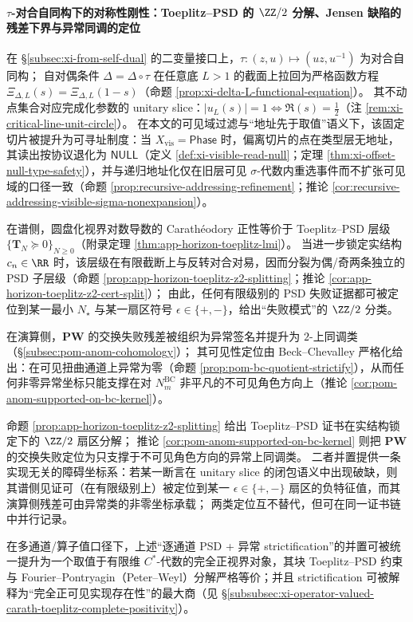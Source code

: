 \paragraph{\texorpdfstring{$\tau$}{tau}-对合自同构下的对称性刚性：Toeplitz--PSD 的 \texorpdfstring{$\ZZ/2$}{Z/2} 分解、Jensen 缺陷的残差下界与异常同调的定位}
在 \S\ref{subsec:xi-from-self-dual} 的二变量接口上，\(\tau:(z,u)\mapsto(uz,u^{-1})\) 为对合自同构；
自对偶条件 \(\Delta=\Delta\circ\tau\) 在任意底 \(L>1\) 的截面上拉回为严格函数方程 \(\Xi_{\Delta,L}(s)=\Xi_{\Delta,L}(1-s)\)（命题 \ref{prop:xi-delta-L-functional-equation}）。
其不动点集合对应完成化参数的 unitary slice：\(|u_L(s)|=1\iff \Re(s)=\tfrac12\)（注 \ref{rem:xi-critical-line-unit-circle}）。
在本文的可见域过滤与“地址先于取值”语义下，该固定切片被提升为可寻址制度：当 \(X_{\mathrm{vis}}=\mathsf{Phase}\) 时，偏离切片的点在类型层无地址，其读出按协议退化为 \(\mathsf{NULL}\)（定义 \ref{def:xi-visible-read-null}；定理 \ref{thm:xi-offset-null-type-safety}），并与递归地址化仅在旧层可见 \(\sigma\)-代数内重选事件而不扩张可见域的口径一致（命题 \ref{prop:recursive-addressing-refinement}；推论 \ref{cor:recursive-addressing-visible-sigma-nonexpansion}）。
\par
在谱侧，圆盘化视界对数导数的 Carath\'eodory 正性等价于 Toeplitz--PSD 层级 \(\{\mathbf{T}_N\succeq 0\}_{N\ge 0}\)（附录定理 \ref{thm:app-horizon-toeplitz-lmi}）。
当进一步锁定实结构 \(c_n\in\RR\) 时，该层级在有限截断上与反转对合对易，因而分裂为偶/奇两条独立的 PSD 子层级（命题 \ref{prop:app-horizon-toeplitz-z2-splitting}；推论 \ref{cor:app-horizon-toeplitz-z2-cert-split}）；
由此，任何有限级别的 PSD 失败证据都可被定位到某一最小 \(N_\star\) 与某一扇区符号 \(\epsilon\in\{+,-\}\)，给出“失败模式”的 \(\ZZ/2\) 分类。
\par
在演算侧，\(\mathbf{PW}\) 的交换失败残差被组织为异常签名并提升为 \(2\)-上同调类（\S\ref{subsec:pom-anom-cohomology}）；
其可见性定位由 Beck--Chevalley 严格化给出：在可见扭曲通道上异常为零（命题 \ref{prop:pom-bc-quotient-strictify}），从而任何非零异常坐标只能支撑在对 \(N^{\mathrm{BC}}_m\) 非平凡的不可见角色方向上（推论 \ref{cor:pom-anom-supported-on-bc-kernel}）。
\begin{remark}\label{rem:xi-toeplitz-z2-anom-alignment}
命题 \ref{prop:app-horizon-toeplitz-z2-splitting} 给出 Toeplitz--PSD 证书在实结构锁定下的 \(\ZZ/2\) 扇区分解；
推论 \ref{cor:pom-anom-supported-on-bc-kernel} 则把 \(\mathbf{PW}\) 的交换失败定位为只支撑于不可见角色方向的异常上同调类。
二者并置提供一条实现无关的障碍坐标系：若某一断言在 unitary slice 的闭包语义中出现破缺，则其谱侧见证可（在有限级别上）被定位到某一 \(\epsilon\in\{+,-\}\) 扇区的负特征值，而其演算侧残差可由异常类的非零坐标承载；
两类定位互不替代，但可在同一证书链中并行记录。
\par
在多通道/算子值口径下，上述“逐通道 PSD + 异常 strictification”的并置可被统一提升为一个取值于有限维 \(C^\ast\)-代数的完全正视界对象，其块 Toeplitz--PSD 约束与 Fourier--Pontryagin（Peter--Weyl）分解严格等价；并且 strictification 可被解释为“完全正可见实现存在性”的最大商（见 \S\ref{subsubsec:xi-operator-valued-carath-toeplitz-complete-positivity}）。
\end{remark}
